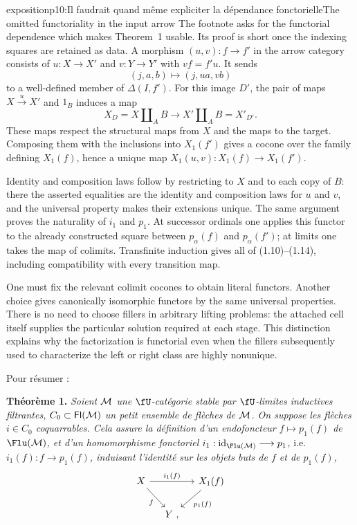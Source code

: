 \begin{dcomment}{exposition}{p10:Il faudrait quand même expliciter la dépendance fonctorielle}{The omitted functoriality in the input arrow}
The footnote asks for the functorial dependence which makes Theorem~1 usable. Its proof is short once the indexing squares are retained as data. A morphism $(u,v):f\to f'$ in the arrow category consists of $u:X\to X'$ and $v:Y\to Y'$ with $vf=f'u$. It sends
\[
 (j,a,b)\longmapsto(j,ua,vb)
\]
to a well-defined member of $\Delta(I,f')$. For this image $D'$, the pair of maps $X\xrightarrow{u}X'$ and $1_B$ induces a map
\[
 X_D=X\amalg_A B\longrightarrow X'\amalg_A B=X'_{D'}.
\]
These maps respect the structural maps from $X$ and the maps to the target. Composing them with the inclusions into $X_1(f')$ gives a cocone over the family defining $X_1(f)$, hence a unique map $X_1(u,v):X_1(f)\to X_1(f')$.

Identity and composition laws follow by restricting to $X$ and to each copy of $B$: there the asserted equalities are the identity and composition laws for $u$ and $v$, and the universal property makes their extensions unique. The same argument proves the naturality of $i_1$ and $p_1$. At successor ordinals one applies this functor to the already constructed square between $p_\alpha(f)$ and $p_\alpha(f')$; at limits one takes the map of colimits. Transfinite induction gives all of (1.10)--(1.14), including compatibility with every transition map.

One must fix the relevant colimit cocones to obtain literal functors. Another choice gives canonically isomorphic functors by the same universal properties. There is no need to choose fillers in arbitrary lifting problems: the attached cell itself supplies the particular solution required at each stage. This distinction explains why the factorization is functorial even when the fillers subsequently used to characterize the left or right class are highly nonunique.
\end{dcomment}


Pour résumer :

\textbf{Théorème 1.} \textit{Soient $\mathcal{M}$ une $\fU$-catégorie stable par $\fU$-limites inductives filtrantes, $C_0 \subset \mathsf{Fl}(\mathcal{M})$ un petit ensemble de flèches de $\mathcal{M}$. On suppose les flèches $i \in C_0$ coquarrables. Cela assure la définition d'un endofoncteur $f \longmapsto p_1(f)$ de $\Flu(\cM)$, et d'un homomorphisme fonctoriel $i_1 : \mathrm{id}_{\Flu(\cM)} \longrightarrow p_1$,} i.e. \textit{$i_1(f) : f \longrightarrow p_1(f)$, induisant l'identité sur les objets buts de $f$ et de $p_1(f)$,}
\[
\begin{tikzcd}[column sep=small]
X \arrow[rr, "i_1(f)"] \arrow[dr, "f"'] & & X_1(f) \arrow[dl, "p_1(f)"] \\
 & Y \ , &
\end{tikzcd}
\]

